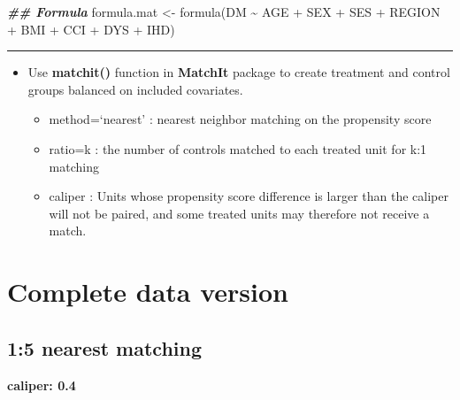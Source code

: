 \documentclass[
]{book}
\newenvironment{Shaded}{\begin{snugshade}}{\end{snugshade}}
\newcommand{\AttributeTok}[1]{\textcolor[rgb]{0.77,0.63,0.00}{#1}}
\newcommand{\DocumentationTok}[1]{\textcolor[rgb]{0.56,0.35,0.01}{\textbf{\textit{#1}}}}
\newcommand{\FloatTok}[1]{\textcolor[rgb]{0.00,0.00,0.81}{#1}}
\newcommand{\FunctionTok}[1]{\textcolor[rgb]{0.00,0.00,0.00}{#1}}
\newcommand{\NormalTok}[1]{#1}
\newcommand{\OtherTok}[1]{\textcolor[rgb]{0.56,0.35,0.01}{#1}}
\newcommand{\SpecialCharTok}[1]{\textcolor[rgb]{0.00,0.00,0.00}{#1}}
\newcommand{\StringTok}[1]{\textcolor[rgb]{0.31,0.60,0.02}{#1}}
\providecommand{\tightlist}{%
  \setlength{\itemsep}{0pt}\setlength{\parskip}{0pt}}
\begin{document}
\begin{Shaded}
\begin{Highlighting}[]
\DocumentationTok{\#\# Formula}
\NormalTok{formula.mat }\OtherTok{\textless{}{-}} \FunctionTok{formula}\NormalTok{(DM }\SpecialCharTok{\textasciitilde{}}\NormalTok{ AGE }\SpecialCharTok{+}\NormalTok{ SEX }\SpecialCharTok{+}\NormalTok{ SES }\SpecialCharTok{+}\NormalTok{ REGION }\SpecialCharTok{+}\NormalTok{ BMI }\SpecialCharTok{+}\NormalTok{ CCI }\SpecialCharTok{+}\NormalTok{ DYS }\SpecialCharTok{+}\NormalTok{ IHD)}
\end{Highlighting}
\end{Shaded}

\begin{center}\rule{0.5\linewidth}{0.5pt}\end{center}

\begin{itemize}
\tightlist
\item
  Use \textbf{matchit()} function in \textbf{MatchIt} package to create treatment and control groups balanced on included covariates.

  \begin{itemize}
  \tightlist
  \item
    method=`nearest' : nearest neighbor matching on the propensity score
  \item
    ratio=k : the number of controls matched to each treated unit for k:1 matching\\
  \item
    caliper : Units whose propensity score difference is larger than the caliper will not be paired, and some treated units may therefore not receive a match.
  \end{itemize}
\end{itemize}

\hypertarget{complete-data-version}{%
\section{Complete data version}\label{complete-data-version}}

\hypertarget{nearest-matching}{%
\subsection{1:5 nearest matching}\label{nearest-matching}}

\textbf{caliper: 0.4}

\begin{Shaded}
\end{Shaded}
\end{document}

